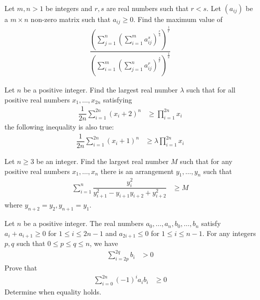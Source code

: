 \documentclass{subfile}
\begin{document}
		\begin{problem}
			Let $m,n>1$ be integers and $r,s$ are real numbers such that $r<s$. Let $(a_{ij})$ be a $m\times n$ non-zero matrix such that $a_{ij}\geq0$. Find the maximum value of
				\begin{align*}
					\dfrac{\left(\sum_{j=1}^{n}\left(\sum_{i=1}^{m}a_{ij}^{s}\right)^{\frac{r}{s}}\right)^{\frac{1}{r}}}{\left(\sum_{i=1}^{m}\left(\sum_{j=1}^{n}a_{ij}^{r}\right)^{\frac{s}{r}}\right)^{\frac{1}{s}}}
				\end{align*}
		\end{problem}
	
		\begin{problem}
			Let $n$ be a positive integer. Find the largest real number $\lambda$ such that for all positive real numbers $x_{1},\ldots,x_{2n}$ satisfying
				\begin{align*}
					\dfrac{1}{2n}\sum_{i=1}^{2n}(x_{i}+2)^{n}
						& \geq \prod_{i=1}^{2n}x_{i}
				\end{align*}
			the following inequality is also true:
				\begin{align*}
					\dfrac{1}{2n}\sum_{i=1}^{2n}(x_{i}+1)^{n}
						& \geq \lambda\prod_{i=1}^{2n}x_{i}
				\end{align*}
		\end{problem}
	
		\begin{problem}
			Let $n\geq 3$ be an integer. Find the largest real number $M$ such that for any positive real numbers $x_{1},\ldots,x_{n}$ there is an arrangement $y_{1},\ldots,y_{n}$ such that
				\begin{align*}
					\sum_{i=1}^{n}\dfrac{y_{i}^{2}}{y_{i+1}^{2}-y_{i+1}y_{i+2}+y_{i+2}^{2}}
						& \geq M
				\end{align*}
			where $y_{n+2}=y_{2},y_{n+1}=y_{1}$.
		\end{problem}
	
		\begin{problem}
			Let $n$ be a positive integer. The real numbers $a_{0},\ldots,a_{n},b_{0},\ldots,b_{n}$ satisfy $a_{i}+a_{i+1}\geq 0$ for $1\leq i\leq 2n-1$ and $a_{2i+1}\leq 0$ for $1\leq i\leq n-1$. For any integers $p,q$ such that $0\leq p\leq q\leq n$, we have
				\begin{align*}
					\sum_{i=2p}^{2q}b_{i}
						& > 0
				\end{align*}
			Prove that
				\begin{align*}
					\sum_{i=0}^{2n}(-1)^{i}a_{i}b_{i}
						& \geq 0
				\end{align*}
			Determine when equality holds.
		\end{problem}
	
\end{document}
